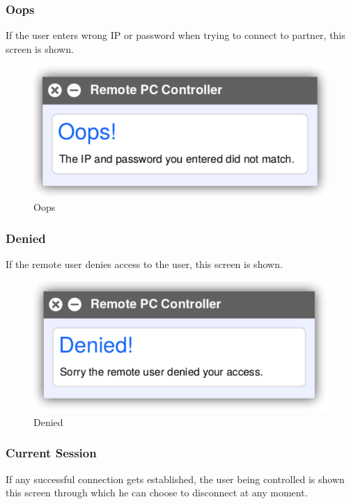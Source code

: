\documentclass[12pt, a4paper]{article}
\begin{document}
\newpage

\subsubsection{Oops}
If the user enters wrong IP or password when trying to connect to partner, this screen is shown.

\begin{figure}[h!]
\centering
\includegraphics[scale=0.75]{oops}
\caption{Oops}
\end{figure}

\subsubsection{Denied}
If the remote user denies access to the user, this screen is shown.

\begin{figure}[h!]
\centering
\includegraphics[scale=0.75]{denied}
\caption{Denied}
\end{figure}

\newpage

\subsubsection{Current Session}
If any successful connection gets established, the user being controlled is shown this screen through which he can choose to disconnect at any moment.
\end{document}
